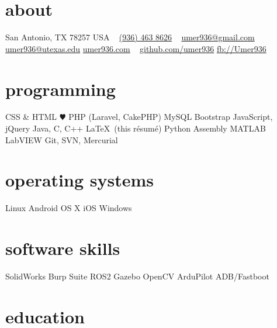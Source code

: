 \documentclass[]{friggeri-cv} %
\begin{document}


\begin{aside} %
	\section{about}
	San Antonio, TX 78257
	USA
	~
	\href{tel:(936) 463-8626}{(936) 463 8626}
	~
	\href{mailto:umer936@gmail.com}{umer936@gmail.com}
	\href{mailto:umer936@utexas.edu}{umer936@utexas.edu}
	\href{http://umer936.com}{umer936.com}
	~
	\href{http://github.com/umer936}{github.com/umer936}
	\href{http://facebook.com/Umer936}{fb://Umer936}
	~
	\section{programming}
	CSS \& HTML
	{\color{red} $\varheartsuit$} PHP (Laravel, CakePHP)
	MySQL
	Bootstrap
	JavaScript, jQuery
	Java, C, C++
	\LaTeX \ (this r\'esum\'e)
	Python
	Assembly
	MATLAB
	LabVIEW
	Git, SVN, Mercurial
	~
	\section{operating systems}
	Linux
	Android
	OS X
	iOS
	Windows
	~
	\section{software skills}
	SolidWorks
	Burp Suite
	ROS2
	Gazebo
	OpenCV
	ArduPilot
	ADB/Fastboot
\end{aside}


\section{education}
\vspace{-12pt}
\end{document}
